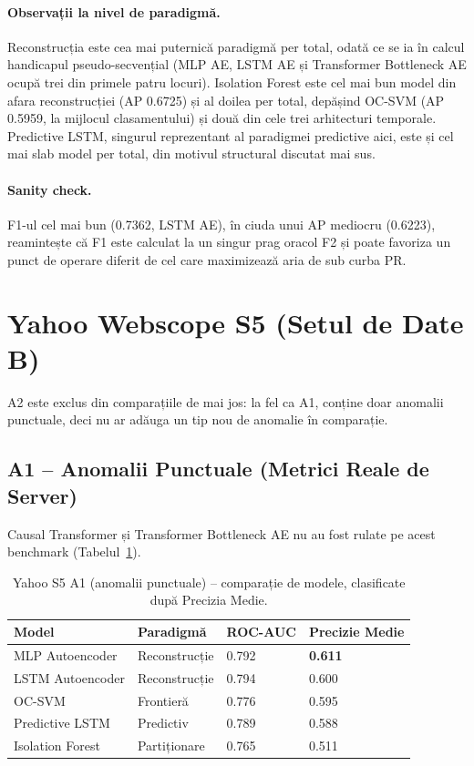\paragraph{Observații la nivel de paradigmă.} Reconstrucția este cea mai puternică paradigmă per total, odată ce se ia în calcul handicapul pseudo-secvențial (MLP AE, LSTM AE și Transformer Bottleneck AE ocupă trei din primele patru locuri). Isolation Forest este cel mai bun model din afara reconstrucției (AP 0.6725) și al doilea per total, depășind OC-SVM (AP 0.5959, la mijlocul clasamentului) și două din cele trei arhitecturi temporale. Predictive LSTM, singurul reprezentant al paradigmei predictive aici, este și cel mai slab model per total, din motivul structural discutat mai sus.

\paragraph{Sanity check.} F1-ul cel mai bun (0.7362, LSTM AE), în ciuda unui AP mediocru (0.6223), reamintește că F1 este calculat la un singur prag oracol F2 și poate favoriza un punct de operare diferit de cel care maximizează aria de sub curba PR.



\section{Yahoo Webscope S5 (Setul de Date B)}

A2 este exclus din comparațiile de mai jos: la fel ca A1, conține doar anomalii punctuale, deci nu ar adăuga un tip nou de anomalie în comparație.

\subsection{A1 -- Anomalii Punctuale (Metrici Reale de Server)}

Causal Transformer și Transformer Bottleneck AE nu au fost rulate pe acest benchmark (Tabelul~\ref{tab:yahoo-a1}).

\begin{table}[h]
\centering
\footnotesize
\begin{tabular}{@{}llll@{}}
\toprule
Model & Paradigmă & ROC-AUC & Precizie Medie \\
\midrule
MLP Autoencoder  & Reconstrucție & 0.792 & \textbf{0.611} \\
LSTM Autoencoder & Reconstrucție & 0.794 & 0.600 \\
OC-SVM           & Frontieră       & 0.776 & 0.595 \\
Predictive LSTM  & Predictiv     & 0.789 & 0.588 \\
Isolation Forest & Partiționare      & 0.765 & 0.511 \\
\bottomrule
\end{tabular}
\caption{Yahoo S5 A1 (anomalii punctuale) -- comparație de modele, clasificate după Precizia Medie.}
\label{tab:yahoo-a1}
\end{table}

